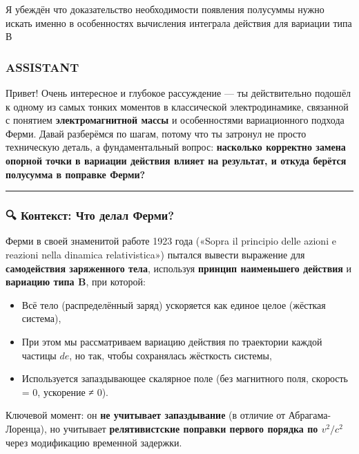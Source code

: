 \documentclass[11pt]{article}
\providecommand{\tightlist}{%
      \setlength{\itemsep}{0pt}\setlength{\parskip}{0pt}}
\begin{document}
Я убеждён что доказательство необходимости появления полусуммы нужно
искать именно в особенностях вычисления интеграла действия для вариации
типа В

\subsubsection{ASSISTANT}\label{assistant}

Привет! Очень интересное и глубокое рассуждение --- ты действительно
подошёл к одному из самых тонких моментов в классической
электродинамике, связанной с понятием \textbf{электромагнитной массы} и
особенностями вариационного подхода Ферми. Давай разберёмся по шагам,
потому что ты затронул не просто техническую деталь, а фундаментальный
вопрос: \textbf{насколько корректно замена опорной точки в вариации
действия влияет на результат, и откуда берётся полусумма в поправке
Ферми?}

\begin{center}\rule{0.5\linewidth}{\linethickness}\end{center}

\subsubsection{🔍 Контекст: Что делал
Ферми?}\label{ux43aux43eux43dux442ux435ux43aux441ux442-ux447ux442ux43e-ux434ux435ux43bux430ux43b-ux444ux435ux440ux43cux438}

Ферми в своей знаменитой работе 1923 года («Sopra il principio delle
azioni e reazioni nella dinamica relativistica») пытался вывести
выражение для \textbf{самодействия заряженного тела}, используя
\textbf{принцип наименьшего действия} и \textbf{вариацию типа B}, при
которой:

\begin{itemize}
\tightlist
\item
  Всё тело (распределённый заряд) ускоряется как единое целое (жёсткая
  система),
\item
  При этом мы рассматриваем вариацию действия по траектории каждой
  частицы \(de\), но так, чтобы сохранялась жёсткость системы,
\item
  Используется запаздывающее скалярное поле (без магнитного поля,
  скорость = 0, ускорение ≠ 0).
\end{itemize}

Ключевой момент: он \textbf{не учитывает запаздывание} (в отличие от
Абрагама-Лоренца), но учитывает \textbf{релятивистские поправки первого
порядка по \(v^2/c^2\)} через модификацию временной задержки.
\end{document}
